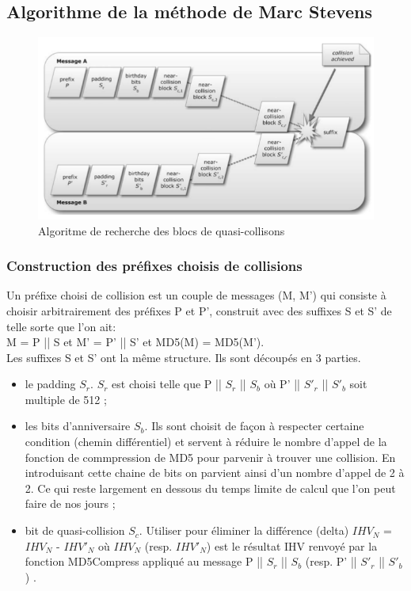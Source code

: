 \documentclass[a4paper,11pt,french]{article}
\begin{document}
\subsection{Algorithme de la méthode de Marc Stevens}
\begin{figure}[h!]
  \includegraphics[scale=.61]{./pics/col.png}
  \caption{Algoritme de recherche des blocs de quasi-collisons}
\end{figure}


\subsubsection{Construction des préfixes choisis de collisions}
Un préfixe choisi de collision est un couple de messages (M, M') qui consiste à choisir arbitrairement des préfixes P et P', construit avec des suffixes S et S' de telle sorte que l'on ait:\\
M = P || S et M' = P' || S' et MD5(M) = MD5(M').\\

Les suffixes S et S' ont la même structure. Ils sont découpés en 3 parties.
\begin{itemize}
\item le padding $S_{r}$. $S_{r}$ est choisi telle que P || $S_{r}$ || $S_{b}$ où P' || $S'_{r}$ || $S'_{b}$ soit multiple de 512 ;
\item les bits d'anniversaire $S_{b}$. Ils sont choisit de façon à respecter certaine condition (chemin différentiel) et servent à réduire le nombre d'appel de la fonction de commpression de MD5 pour parvenir à trouver une collision. En introduisant cette chaine de bits on parvient ainsi d'un nombre d'appel de 2 à 2. Ce qui reste largement en dessous du temps limite de calcul que l'on peut faire de nos jours ;
\item bit de quasi-collision $S_{c}$. Utiliser pour éliminer la différence (delta) $IHV_N$ = $IHV_N$ - $IHV'_N$ où $IHV_N$ (resp. $IHV'_N$) est le résultat IHV renvoyé par la fonction MD5Compress appliqué au message P || $S_{r}$ || $S_{b}$ (resp. P' || $S'_{r}$ || $S'_{b}$) .
\end{itemize}
\vspace{.5cm}
\end{document}
